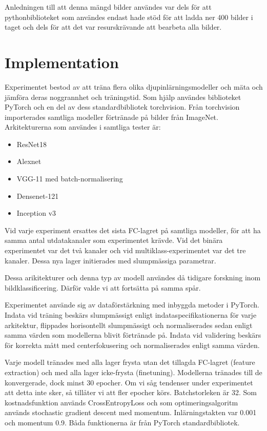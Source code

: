 \documentclass[]{kththesis}
\begin{document}
Anledningen till att denna mängd bilder användes var dels för att pythonbiblioteket som användes endast hade stöd för att ladda ner 400 bilder i taget och dels för att det var resurskrävande att bearbeta alla bilder.


\section{Implementation}
Experimentet bestod av att träna flera olika djupinlärningsmodeller och mäta och jämföra deras noggrannhet och träningstid. Som hjälp användes biblioteket PyTorch \parencite{paszke2017automatic} och en del av dess standardbibliotek torchvision. Från torchvision importerades samtliga modeller förtränade på bilder från ImageNet. Arkitekturerna som användes i samtliga tester är:
\begin{itemize}
  \item ResNet18
  \item Alexnet
  \item VGG-11 med batch-normalisering
  \item Densenet-121
  \item Inception v3
\end{itemize}

Vid varje experiment ersattes det sista FC-lagret på samtliga modeller, för att ha samma antal utdatakanaler som experimentet krävde. Vid det binära experimentet var det två kanaler och vid multiklass-experimentet var det tre kanaler. Dessa nya lager initierades med slumpmässiga parametrar.

Dessa arikitekturer och denna typ av modell användes då tidigare forskning inom bildklassificering. Därför valde vi att fortsätta på samma spår. 

Experimentet använde sig av dataförstärkning med inbyggda metoder i PyTorch. Indata vid träning beskärs slumpmässigt enligt indataspecifikationerna för varje arkitektur, flippades horisontellt slumpmässigt och normaliserades sedan enligt samma värden som modellerna blivit förtränade på. Indata vid validering beskärs för korrekta mått med centerfokusering och normaliserades enligt samma värden.

Varje modell tränades med alla lager frysta utan det tillagda FC-lagret (feature extraction) och med alla lager icke-frysta (finetuning). Modellerna tränades till de konvergerade, dock minst 30 epocher. Om vi såg tendenser under experimentet att detta inte sker, så tillåter vi att fler epocher körs. Batchstorleken är 32. Som kostnadsfunktion används CrossEntropyLoss och som optimeringsalgoritm används stochastic gradient descent med momentum. Inlärningstakten var 0.001 och momentum 0.9. Båda funktionerna är från PyTorch standardbibliotek.
\end{document}
